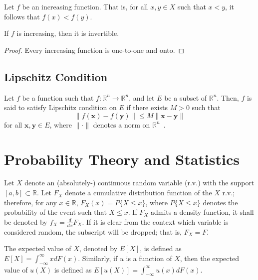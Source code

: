 Let $f$ be an increasing function. That is, for all $x,y\in X$ such that $x < y$, it follows that $f(x) < f(y)$.
\begin{corollary}
\label{cor:increasing_invertible_notation}
If $f$ is increasing, then it is invertible.
\end{corollary}
\begin{proof}
Every increasing function is one-to-one and onto.
\end{proof}

\subsection{Lipschitz Condition} %
\label{sub:lipschitz_condition_notation}
Let $f$ be a function such that $f: \mathbb{R}^n \to \mathbb{R}^n$, and let $E$ be a subset of $\mathbb{R}^n$. Then, $f$ is said to satisfy Lipschitz condition on $E$ if there exists $M>0$ such that
\begin{equation}
	\|f(\mathbf{x}) - f(\mathbf{y})\| \leq M \| \mathbf{x} - \mathbf{y} \|
\end{equation}
for all $\mathbf{x},\mathbf{y}\in E$, where $\|\cdot\|$ denotes a norm on $\mathbb{R}^n$~\cite{HubbardPaarsch2011,SteinShakarchiCH7}.

\section{Probability Theory and Statistics} %
\label{sec:probability_notation}
Let $X$ denote an (absolutely-) continuous random variable (r.v.) with the support $[a, b]\subset\mathbb{R}$. Let $F_{X}$ denote a cumulative distribution function of the $X$ r.v.; therefore, for any $x\in\mathbb{R}$, $F_{X}(x) = P\{X \le x\}$, where $P\{X\le x\}$ denotes the probability of the event such that $X\le x$. If $F_{X}$ admits a density function, it shall be denoted by $f_{X} = \frac{d}{dx}F_{X}$. If it is clear from the context which variable is considered random, the subscript will be dropped; that is, $F_{X}= F$.

The expected value of $X$, denoted by $E[X]$, is defined as $E[X] = \int_{-\infty}^{\infty} xdF(x)$. Similarly, if $u$ is a function of $X$, then the expected value of $u(X)$ is defined as $E[u(X)] = \int_{-\infty}^{\infty} u(x)dF(x)$.

